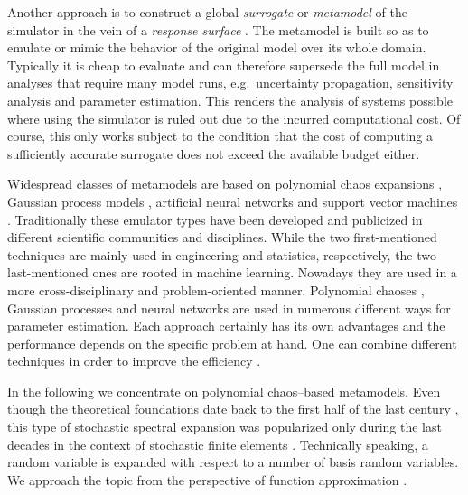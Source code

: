Another approach is to construct a global \emph{surrogate} or \emph{metamodel} of the simulator in the vein of a \emph{response surface} \cite{Statistics:Box2007,Statistics:Myers2016}.
The metamodel is built so as to emulate or mimic the behavior of the original model over its whole domain.
Typically it is cheap to evaluate and can therefore supersede the full model in analyses that require many model runs,
e.g.\ uncertainty propagation, sensitivity analysis and parameter estimation.
This renders the analysis of systems possible where using the simulator is ruled out due to the incurred computational cost.
Of course, this only works subject to the condition that the cost of computing a sufficiently accurate surrogate does not exceed the available budget either.
\par %
Widespread classes of metamodels are based on polynomial chaos expansions \cite{PCE:LeMaitre2010,PCE:Xiu2010},
Gaussian process models \cite{Kriging:Santner2003,Kriging:Rasmussen2006}, artificial neural networks \cite{ML:Bishop1995,ML:Ripley1996}
and support vector machines \cite{ML:Christmann2008,ML:Abe2010}.
Traditionally these emulator types have been developed and publicized in different scientific communities and disciplines.
While the two first-mentioned techniques are mainly used in engineering and statistics, respectively, the two last-mentioned ones are rooted in machine learning.
Nowadays they are used in a more cross-disciplinary and problem-oriented manner.
Polynomial chaoses \cite{PCE:Marzouk2007,PCE:Marzouk2009:a}, Gaussian processes \cite{Bayesian:Joseph2012,Bayesian:Joseph2013}
and neural networks \cite{ML:Raudensky1996,ML:Mares2016} are used in numerous different ways for parameter estimation.
Each approach certainly has its own advantages and the performance depends on the specific problem at hand.
One can combine different techniques in order to improve the efficiency \cite{Kriging:Kersaudy2015,Kriging:Schobi2015,PCE:Spiridonakos2015,PCE:Mai2016}.
\par %
In the following we concentrate on polynomial chaos--based metamodels.
Even though the theoretical foundations date back to the first half of the last century \cite{PCE:Wiener1938,PCE:Cameron1947},
this type of stochastic spectral expansion was popularized only during the last decades in the context of stochastic finite elements \cite{PCE:Ghanem1990,PCE:Ghanem1991}.
Technically speaking, a random variable is expanded with respect to a number of basis random variables.
We approach the topic from the perspective of function approximation \cite{Math:Rivlin1969,Math:DeVilliers2012}.
